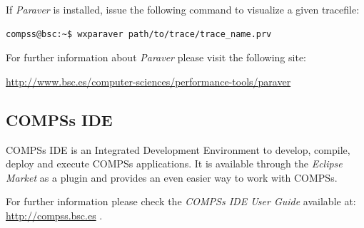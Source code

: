 If \textit{Paraver} is installed, issue the following command to visualize a given tracefile:

\begin{lstlisting}[language=bash]
compss@bsc:~$ wxparaver path/to/trace/trace_name.prv
\end{lstlisting}

For further information about \textit{Paraver} please visit the following site:
\begin{center}
\url{http://www.bsc.es/computer-sciences/performance-tools/paraver}
\end{center}

\newpage

\subsection{COMPSs IDE}
\label{subsec:IDE}
COMPSs IDE is an Integrated Development Environment to develop, compile, deploy and execute COMPSs applications. It is available
through the \textit{Eclipse Market} as a plugin and provides an even easier way to work with COMPSs.

For further information please check the \textit{COMPSs IDE User Guide} available at: \url{http://compss.bsc.es} .
